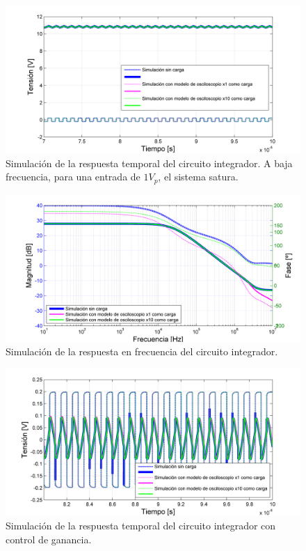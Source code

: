 \begin{figure}[H]
  \centering
\includegraphics[width=1.1\textwidth]{gfx_22/INT1_T}
  \caption{Simulación de la respuesta temporal del circuito integrador. A baja frecuencia, para una entrada de $1V_p$, el sistema satura.}
  \label{t:int1}
\end{figure}

\begin{figure}[H]
  \centering
\includegraphics[width=1.1\textwidth]{gfx_22/INT1_F}
  \caption{Simulación de la respuesta en frecuencia del circuito integrador.}
  \label{f:int1}
\end{figure}



\begin{figure}[H]
  \centering
\includegraphics[width=1.1\textwidth]{gfx_22/INT2_T}
  \caption{Simulación de la respuesta temporal del circuito integrador con control de ganancia.}
  \label{t:int2}
\end{figure}

